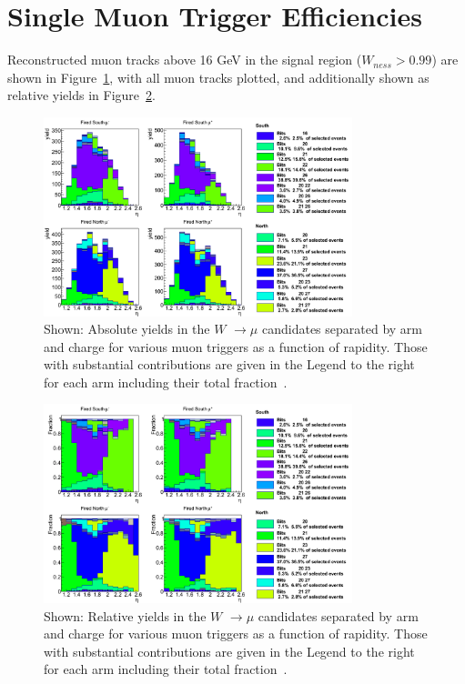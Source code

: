 \clearpage
\section{Single Muon Trigger Efficiencies}
Reconstructed muon tracks above 16 GeV in the signal region ($W_{ness} > 0.99$)
are shown in Figure~\ref{fig:triggerstack_all}, with all muon tracks plotted,
and additionally shown as relative yields in
Figure~\ref{fig:triggerrel_all}.

\begin{figure}[ht]
  \centering
  \includegraphics[width=0.8\textwidth]{./figures/triggerstack13_all.png}
  \caption{
    Shown: Absolute yields in the $W$ $\rightarrow \mu$ candidates separated by
    arm and charge for various muon triggers as a function of rapidity. Those
    with substantial contributions are given in the Legend to the right for each
    arm including their total fraction~\cite{Seidl2014}.
  }
  \label{fig:triggerstack_all} 
\end{figure}

\begin{figure}[ht]
  \centering
  \includegraphics[width=0.8\textwidth]{./figures/triggerrel13_all.png}
  \caption{
    Shown: Relative yields in the $W$ $\rightarrow \mu$ candidates separated by
    arm and charge for various muon triggers as a function of rapidity. Those
    with substantial contributions are given in the Legend to the right for each
    arm including their total fraction~\cite{Seidl2014}.
  }
  \label{fig:triggerrel_all} 
\end{figure}

